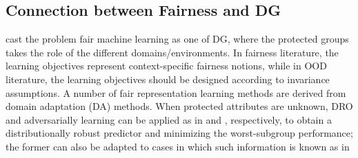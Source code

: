 \subsection{Connection between Fairness and DG}\label{ssec:fairml-dg-cxn}
\citet{creager2021environment} cast the problem fair machine learning as one of DG,
where the protected groups takes the role of the different domains/environments. 
%
In fairness literature, the learning objectives represent context-specific fairness notions, while
in OOD literature, the learning objectives should be designed according to invariance assumptions.
%
A number of fair representation learning methods \citep{edwards2015censoring, madras2018learning}
are derived from domain adaptation (DA) methods. When protected attributes are unknown, DRO and
adversarially learning can be applied as in \citet{hashimoto2018fairness} and
\citet{lahoti2020fairness}, respectively, to obtain a distributionally robust predictor and
minimizing the worst-subgroup performance; the former can also be adapted to cases in which such
information is known as in \citet{sagawa2019distributionally} 




%

